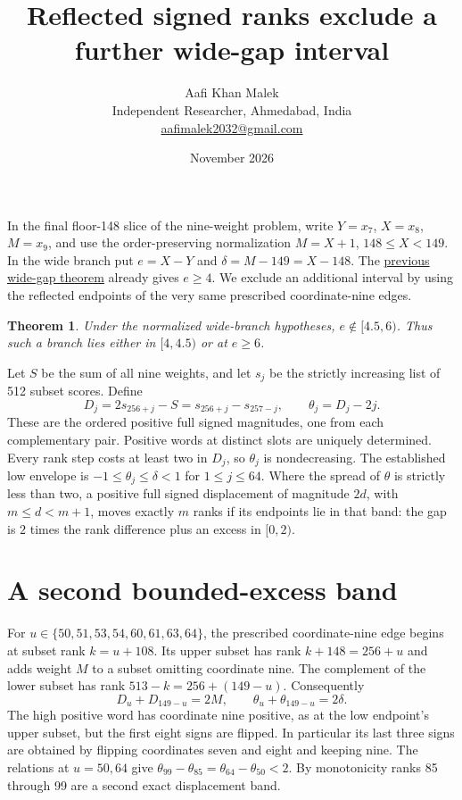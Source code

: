 \documentclass[11pt,letterpaper]{article}
\title{Reflected signed ranks exclude a further wide-gap interval}
\author{Aafi Khan Malek\\\small Independent Researcher, Ahmedabad, India\\
\small\href{mailto:aafimalek2032@gmail.com}{aafimalek2032@gmail.com}}
\date{November 2026}
\newtheorem{theorem}{Theorem}
\begin{document}
\maketitle
In the final floor-148 slice of the nine-weight problem, write
\(Y=x_7\), \(X=x_8\), \(M=x_9\), and use the order-preserving
normalization \(M=X+1\), \(148\le X<149\). In the wide branch
put \(e=X-Y\) and \(\delta=M-149=X-148\).
The \href{https://github.com/Aafimalek/novel-discoveries/tree/9c9ed690d315cce1846c51fd0845d85fff7e2ca4/nine-separated-subset-sums/verification/rank-cuts-below-150/wide-gap-four}{previous wide-gap theorem}
already gives \(e\ge4\). We exclude an additional interval by
using the reflected endpoints of the very same prescribed
coordinate-nine edges.
\begin{theorem}
Under the normalized wide-branch hypotheses, \(e\notin[4.5,6)\).
Thus such a branch lies either in \([4,4.5)\) or at \(e\ge6\).
\end{theorem}

Let \(S\) be the sum of all nine weights, and let \(s_j\) be
the strictly increasing list of 512 subset scores. Define
\[
 D_j=2s_{256+j}-S=s_{256+j}-s_{257-j},\qquad
 \theta_j=D_j-2j .
\]
These are the ordered positive full signed magnitudes, one from
each complementary pair. Positive words at distinct slots are
uniquely determined. Every rank step costs at least two in
\(D_j\), so \(\theta_j\) is nondecreasing. The established low
envelope is \(-1\le\theta_j\le\delta<1\) for \(1\le j\le64\).
Where the spread of \(\theta\) is strictly less than two, a
positive full signed displacement of magnitude \(2d\), with
\(m\le d<m+1\), moves exactly \(m\) ranks if its endpoints
lie in that band: the gap is \(2\) times the rank difference
plus an excess in \([0,2)\).

\section*{A second bounded-excess band}
For \(u\in\{50,51,53,54,60,61,63,64\}\), the prescribed
coordinate-nine edge begins at subset rank \(k=u+108\).
Its upper subset has rank \(k+148=256+u\) and adds weight
\(M\) to a subset omitting coordinate nine. The complement
of the lower subset has rank \(513-k=256+(149-u)\).
Consequently
\[
 D_u+D_{149-u}=2M,\qquad
 \theta_u+\theta_{149-u}=2\delta .
\]
The high positive word has coordinate nine positive, as at
the low endpoint's upper subset, but the first eight signs
are flipped. In particular its last three signs are obtained
by flipping coordinates seven and eight and keeping nine.
The relations at \(u=50,64\) give
\(\theta_{99}-\theta_{85}=\theta_{64}-\theta_{50}<2\).
By monotonicity ranks 85 through 99 are a second exact
displacement band.
\end{document}
